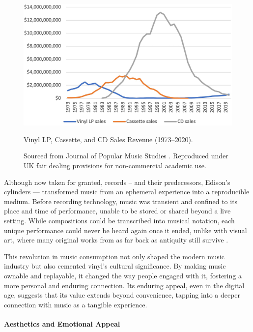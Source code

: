             \begin{figure}[htbp]
                \centering
                \includegraphics[width=\linewidth]{images/vinyl_sales_2023.png}
                \caption{Vinyl LP, Cassette, and CD Sales Revenue (1973–2020).}
                \caption*{Sourced from Journal of Popular Music Studies \cite{vinylRevival}. Reproduced under UK fair dealing provisions for non-commercial academic use.}
                \label{fig:vinyl_sales}
            \end{figure}
    
            Although now taken for granted, records -- and their predecessors, Edison's cylinders — transformed music from an ephemeral experience into a reproducible medium. Before recording technology, music was transient and confined to its place and time of performance, unable to be stored or shared beyond a live setting. While compositions could be transcribed into musical notation, each unique performance could never be heard again once it ended, unlike with visual art, where many original works from as far back as antiquity still survive \cite{jdbond}.
    
            This revolution in music consumption not only shaped the modern music industry but also cemented vinyl’s cultural significance. By making music ownable and replayable, it changed the way people engaged with it, fostering a more personal and enduring connection. Its enduring appeal, even in the digital age, suggests that its value extends beyond convenience, tapping into a deeper connection with music as a tangible experience.
    
            \paragraph{Aesthetics and Emotional Appeal}
    
